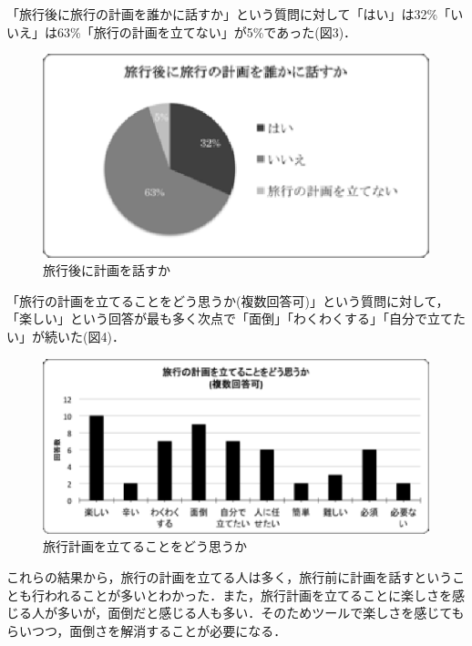 \documentclass{funthesis}
\begin{document}
「旅行後に旅行の計画を誰かに話すか」という質問に対して「はい」は32\%「いいえ」は63\%「旅行の計画を立てない」が5\%であった(図3)．\\
\begin{figure}[htpb]
\begin{center}
\includegraphics[scale=1.0]{aftertalktrip.eps}
\caption{旅行後に計画を話すか}
\end{center}
\end{figure}

「旅行の計画を立てることをどう思うか(複数回答可)」という質問に対して，「楽しい」という回答が最も多く次点で「面倒」「わくわくする」「自分で立てたい」が続いた(図4)．\\
\begin{figure}[htpb]
\begin{center}
\includegraphics[scale=1.0]{howthinktrip.eps}
\caption{旅行計画を立てることをどう思うか}
\end{center}
\end{figure}

これらの結果から，旅行の計画を立てる人は多く，旅行前に計画を話すということも行われることが多いとわかった．また，旅行計画を立てることに楽しさを感じる人が多いが，面倒だと感じる人も多い．そのためツールで楽しさを感じてもらいつつ，面倒さを解消することが必要になる．\\
\end{document}
